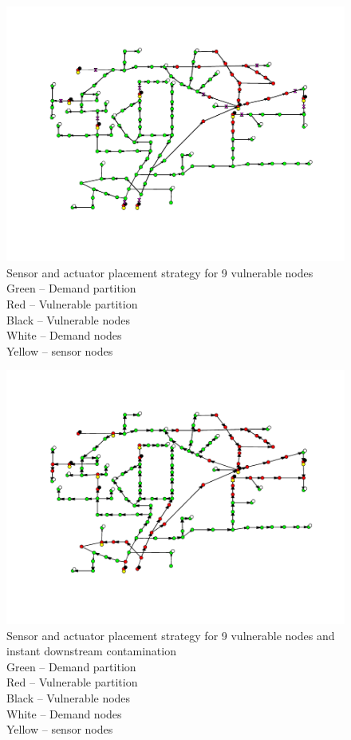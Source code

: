 \documentclass[authoryear,preprint,review,12pt]{elsarticle}
\begin{document}
\begin{figure}[ht]
\includegraphics[width=\linewidth]{images/zoneContainment_9sources}\caption{Sensor and actuator placement strategy for 9 vulnerable nodes\protect \\
Green -- Demand partition\protect \\
Red -- Vulnerable partition\protect \\
Black -- Vulnerable nodes\protect \\
White -- Demand nodes\protect \\
Yellow -- sensor nodes}
    \label{fig:zoneContainment_9sources}
\end{figure}
\begin{figure}[ht]
\includegraphics[width=\linewidth]{images/containment_9sources_1downstreamSourceEach}\caption{Sensor and actuator placement strategy for 9 vulnerable nodes and
instant downstream contamination\protect \\
Green -- Demand partition\protect \\
Red -- Vulnerable partition\protect \\
Black -- Vulnerable nodes\protect \\
White -- Demand nodes\protect \\
Yellow -- sensor nodes}
    \label{fig:containment_9sources_1downstreamSourceEach}
\end{figure}
\end{document}
